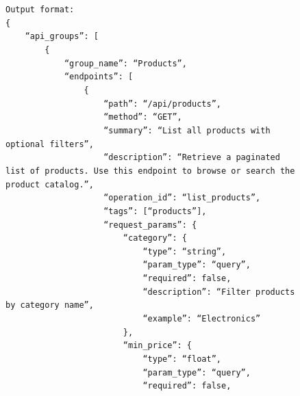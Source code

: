 \begin{figure}[p]
{\begin{minipage}{0.97\textwidth}
        \texttt{Output format:}\\
        \texttt{\{}\\
        \texttt{~~~~``api\_groups'': [}\\
        \texttt{~~~~~~~~\{}\\
        \texttt{~~~~~~~~~~~~``group\_name'': ``Products'',}\\
        \texttt{~~~~~~~~~~~~``endpoints'': [}\\
        \texttt{~~~~~~~~~~~~~~~~\{}\\
        \texttt{~~~~~~~~~~~~~~~~~~~~``path'': ``/api/products'',}\\
        \texttt{~~~~~~~~~~~~~~~~~~~~``method'': ``GET'',}\\
        \texttt{~~~~~~~~~~~~~~~~~~~~``summary'': ``List all products with optional filters'',}\\
        \texttt{~~~~~~~~~~~~~~~~~~~~``description'': ``Retrieve a paginated list of products. Use this endpoint to browse or search the product catalog.'',}\\
        \texttt{~~~~~~~~~~~~~~~~~~~~``operation\_id'': ``list\_products'',}\\
        \texttt{~~~~~~~~~~~~~~~~~~~~``tags'': [``products''],}\\
        \texttt{~~~~~~~~~~~~~~~~~~~~``request\_params'': \{}\\
        \texttt{~~~~~~~~~~~~~~~~~~~~~~~~``category'': \{}\\
        \texttt{~~~~~~~~~~~~~~~~~~~~~~~~~~~~``type'': ``string'',}\\
        \texttt{~~~~~~~~~~~~~~~~~~~~~~~~~~~~``param\_type'': ``query'',}\\
        \texttt{~~~~~~~~~~~~~~~~~~~~~~~~~~~~``required'': false,}\\
        \texttt{~~~~~~~~~~~~~~~~~~~~~~~~~~~~``description'': ``Filter products by category name'',}\\
        \texttt{~~~~~~~~~~~~~~~~~~~~~~~~~~~~``example'': ``Electronics''}\\
        \texttt{~~~~~~~~~~~~~~~~~~~~~~~~\},}\\
        \texttt{~~~~~~~~~~~~~~~~~~~~~~~~``min\_price'': \{}\\
        \texttt{~~~~~~~~~~~~~~~~~~~~~~~~~~~~``type'': ``float'',}\\
        \texttt{~~~~~~~~~~~~~~~~~~~~~~~~~~~~``param\_type'': ``query'',}\\
        \texttt{~~~~~~~~~~~~~~~~~~~~~~~~~~~~``required'': false,}\\

\end{minipage}}
\end{figure}
